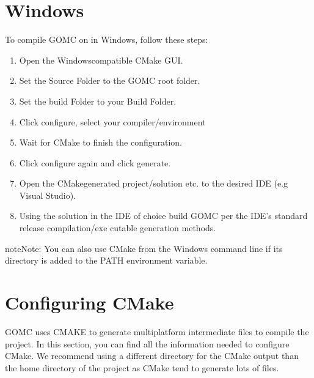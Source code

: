 \documentclass[letterpaper,10pt,english]{sphinxmanual}
\begin{document}
\section{Windows}
\label{\detokenize{compiling:windows}}
\sphinxAtStartPar
To compile GOMC on in Windows, follow these steps:
\begin{enumerate}
%
\item {} 
\sphinxAtStartPar
Open the Windows\sphinxhyphen{}compatible CMake GUI.

\item {} 
\sphinxAtStartPar
Set the Source Folder to the GOMC root folder.

\item {} 
\sphinxAtStartPar
Set the build Folder to your Build Folder.

\item {} 
\sphinxAtStartPar
Click configure, select your compiler/environment

\item {} 
\sphinxAtStartPar
Wait for CMake to finish the configuration.

\item {} 
\sphinxAtStartPar
Click configure again and click generate.

\item {} 
\sphinxAtStartPar
Open the CMake\sphinxhyphen{}generated project/solution etc. to the desired IDE (e.g Visual Studio).

\item {} 
\sphinxAtStartPar
Using the solution in the IDE of choice build GOMC per the IDE’s standard release compilation/exe\sphinxhyphen{} cutable generation methods.

\end{enumerate}

\begin{sphinxadmonition}{note}{Note:}
\sphinxAtStartPar
You can also use CMake from the Windows command line if its directory is added to the PATH environment variable.
\end{sphinxadmonition}


\section{Configuring CMake}
\label{\detokenize{compiling:configuring-cmake}}
\sphinxAtStartPar
GOMC uses CMAKE to generate multi\sphinxhyphen{}platform intermediate files to compile the project. In this section, you can find all the information needed to configure CMake.
We recommend using a different directory for the CMake output than the home directory of the project as CMake tend to generate lots of files.
\end{document}
